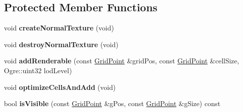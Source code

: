 \subsection*{Protected Member Functions}
\begin{DoxyCompactItemize}
\item 
\mbox{\label{class_graphics_terrain_a18e6c99d2b81a64230a0d8aab48ed6f4}} 
void {\bfseries create\+Normal\+Texture} (void)
\item 
\mbox{\label{class_graphics_terrain_a93d81648750634ca5e420f671f0277d3}} 
void {\bfseries destroy\+Normal\+Texture} (void)
\item 
\mbox{\label{class_graphics_terrain_a492e06b03ef8462322469d961e192b46}} 
void {\bfseries add\+Renderable} (const \hyperlink{struct_grid_point}{Grid\+Point} \&grid\+Pos, const \hyperlink{struct_grid_point}{Grid\+Point} \&cell\+Size, Ogre\+::uint32 lod\+Level)
\item 
\mbox{\label{class_graphics_terrain_a35615fa429a0eeda2b5ea8fe908bbc5a}} 
void {\bfseries optimize\+Cells\+And\+Add} (void)
\item 
\mbox{\label{class_graphics_terrain_a4633b2fde146e8acde31db85fba26832}} 
bool {\bfseries is\+Visible} (const \hyperlink{struct_grid_point}{Grid\+Point} \&g\+Pos, const \hyperlink{struct_grid_point}{Grid\+Point} \&g\+Size) const
\end{DoxyCompactItemize}
